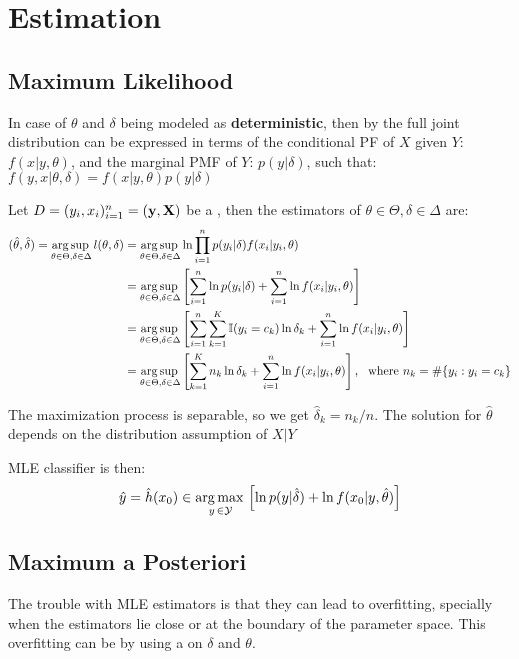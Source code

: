 \section{Estimation}

\subsection{Maximum Likelihood}
In case of $\theta$ and $\delta$ being modeled as \textbf{deterministic}, then by  the full joint distribution can be expressed in terms of the conditional PF of $X$ given $Y$: $f(x|y,\theta)$, and the marginal PMF of $Y$: $p(y|\delta)$, such that: 
$f(y,x|\theta,\delta) = f(x|y,\theta)p(y|\delta)$

Let $D=(y_i,x_i)_{i=1}^n=(\vb{y},\vb{X})$ be a , then the  estimators of $\theta\in\Theta, \delta\in\Delta$ are:
\begin{align*}
    (\hat{\theta},\hat{\delta}) = \operatorname*{arg\,sup\,}_{\theta\in\Theta, \delta\in\Delta}l(\theta,\delta) &= \operatorname*{arg\,sup\,}_{\theta\in\Theta, \delta\in\Delta} \ln\prod_{i=1}^n p(y_i|\delta)f(x_i|y_i,\theta) \\
    &= \operatorname*{arg\,sup\,}_{\theta\in\Theta, \delta\in\Delta} \left[\sum_{i=1}^n\ln p(y_i|\delta)+\sum_{i=1}^n\ln f(x_i|y_i,\theta)\right] \\
    &= \operatorname*{arg\,sup\,}_{\theta\in\Theta, \delta\in\Delta} \left[\sum_{i=1}^n\sum_{k=1}^K \operatorname{\mathbb{I}}(y_i=c_k)\ln\delta_k+\sum_{i=1}^n\ln f(x_{i}|y_i,\theta)\right]\\
    &= \operatorname*{arg\,sup\,}_{\theta\in\Theta, \delta\in\Delta} \left[\sum_{k=1}^K n_k\ln\delta_k+\sum_{i=1}^n\ln f(x_{i}|y_i,\theta)\right],\ \text{ where } n_k=\#\{y_i : y_i=c_k\}
\end{align*}

The maximization process is separable, so we get $\hat{\delta}_{k}=n_k/n$. The solution for $\hat{\theta}$ depends on the distribution assumption of $X|Y$

MLE classifier is then:
\begin{equation*}
    \hat{y}=\hat{h}(x_0) \in \operatorname*{arg\,max\,}_{y\,\in\mathcal{Y}}\left[ \ln p(y|\hat{\delta})+\ln f(x_0|y,\hat{\theta})\right]
\end{equation*}

\subsection{Maximum a Posteriori}
The trouble with MLE estimators is that they can lead to overfitting, specially when the estimators lie close or at the boundary of the parameter space. This overfitting can be  by using a  on $\delta$ and $\theta$. 

